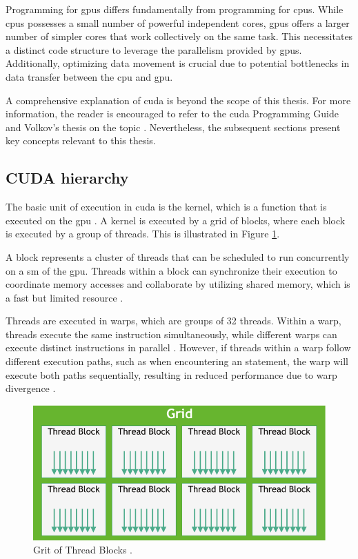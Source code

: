 Programming for \glspl{gpu} differs fundamentally from programming for \glspl{cpu}.
While \glspl{cpu} possesses a small number of powerful independent cores, \glspl{gpu} offers a larger number of simpler cores that work collectively on the same task.
This necessitates a distinct code structure to leverage the parallelism provided by \glspl{gpu}.
Additionally, optimizing data movement is crucial due to potential bottlenecks in data transfer between the \gls{cpu} and \gls{gpu}.

A comprehensive explanation of \gls{cuda} is beyond the scope of this thesis.
For more information, the reader is encouraged to refer to the \gls{cuda} Programming Guide \cite{nvidiaCUDAProgrammingGuide} and Volkov's thesis on the topic \cite{volkovLatencyHiding2016}.
Nevertheless, the subsequent sections present key concepts relevant to this thesis.

\subsection{CUDA hierarchy}
The basic unit of execution in \gls{cuda} is the kernel, which is a function that is executed on the \gls{gpu} \cite[11]{nvidiaCUDAProgrammingGuide}.
A kernel is executed by a grid of blocks, where each block is executed by a group of threads.
This is illustrated in Figure \ref{fig:cuda_hierarchy}.

A block represents a cluster of threads that can be scheduled to run concurrently on a \gls{sm} of the \gls{gpu}.
Threads within a block can synchronize their execution to coordinate memory accesses and collaborate by utilizing shared memory, which is a fast but limited resource \cite[13,19]{nvidiaCUDAProgrammingGuide}.

Threads are executed in warps, which are groups of 32 threads.
Within a warp, threads execute the same instruction simultaneously, while different warps can execute distinct instructions in parallel \cite[10-12]{volkovLatencyHiding2016}.
However, if threads within a warp follow different execution paths, such as when encountering an  statement, the warp will execute both paths sequentially, resulting in reduced performance due to warp divergence \cite[10-12]{volkovLatencyHiding2016}.

\begin{figure}[H]
    \centering
    \includegraphics[width=.6\textwidth]{figures/concurrency/cuda_hierarchy.pdf}
    \caption{Grit of Thread Blocks \cite[15]{nvidiaCUDAProgrammingGuide}.}
    \label{fig:cuda_hierarchy}
\end{figure}

